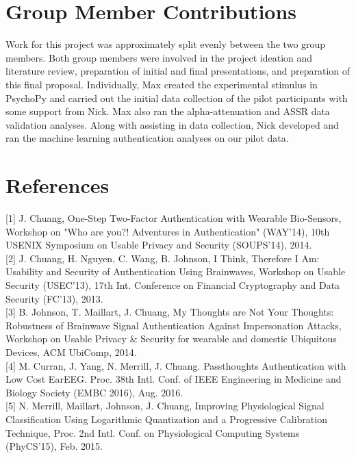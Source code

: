 \documentclass[11pt]{article}
\begin{document}
\section{Group Member Contributions}
Work for this project was approximately split evenly between the two group members. Both group members were involved in the project
ideation and literature review, preparation of initial and final presentations, and preparation of this final proposal. Individually, Max created
the experimental stimulus in PsychoPy and carried out the initial data collection of the pilot participants with some support from Nick. Max 
also ran the alpha-attenuation and ASSR data validation analyses. Along with assisting in data collection, Nick developed and ran the machine
 learning authentication analyses on our pilot data.

\section{References}
\label{sec:org0b0b225}
\setlength\parindent{0pt}

[1]
J. Chuang, One-Step Two-Factor Authentication with Wearable Bio-Sensors, Workshop on
"Who are you?! Adventures in Authentication" (WAY'14), 10th USENIX Symposium on
Usable Privacy and Security (SOUPS'14), 2014.
\hspace{0pt} \\

[2]
J. Chuang, H. Nguyen, C. Wang, B. Johnson, I Think, Therefore I Am: Usability and
Security of Authentication Using Brainwaves, Workshop on Usable Security (USEC'13),
17th Int. Conference on Financial Cryptography and Data Security (FC’13), 2013.
\hspace{0pt} \\

[3]
B. Johnson, T. Maillart, J. Chuang, My Thoughts are Not Your Thoughts: Robustness of
Brainwave Signal Authentication Against Impersonation Attacks, Workshop on Usable
Privacy \& Security for wearable and domestic Ubiquitous Devices, ACM UbiComp, 2014.
\hspace{0pt} \\

[4]
M. Curran, J. Yang, N. Merrill, J. Chuang. Passthoughts Authentication with Low Cost
EarEEG. Proc. 38th Intl. Conf. of IEEE Engineering in Medicine and Biology Society
(EMBC 2016), Aug. 2016.
\hspace{0pt} \\

[5]
N. Merrill, Maillart, Johnson, J. Chuang, Improving Physiological Signal Classification Using
Logarithmic Quantization and a Progressive Calibration Technique, Proc. 2nd Intl. Conf. on
Physiological Computing Systems (PhyCS'15), Feb. 2015.
\hspace{0pt} \\
\end{document}
